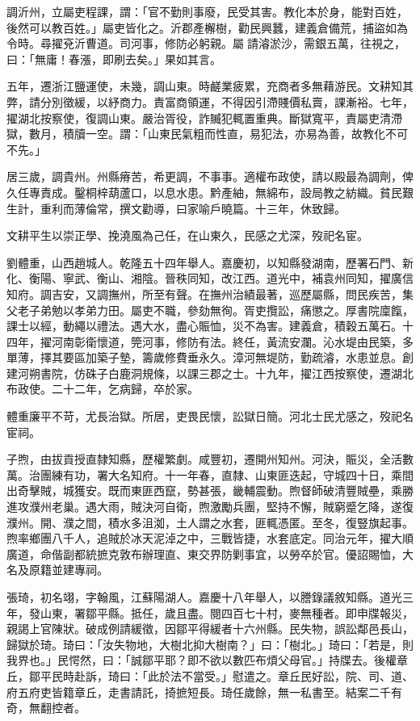 \begin{pinyinscope}
調沂州，立屬吏程課，謂：「官不勤則事廢，民受其害。教化本於身，能對百姓，後然可以教百姓。」屬吏皆化之。沂郡產檞樹，勸民興蠶，建義倉備荒，捕盜如為令時。尋擢兗沂曹道。司河事，修防必躬親。屬請濬淤沙，需銀五萬，往視之，曰：「無庸！春漲，即刷去矣。」果如其言。

五年，遷浙江鹽運使，未幾，調山東。時鹺業疲累，充商者多無藉游民。文耕知其弊，請分別徵緩，以紓商力。責富商領運，不得因引滯賤價私賣，課漸裕。七年，擢湖北按察使，復調山東。嚴治胥役，詐贓犯輒置重典。斷獄寬平，責屬吏清滯獄，數月，積牘一空。謂：「山東民氣粗而性直，易犯法，亦易為善，故教化不可不先。」

居三歲，調貴州。州縣瘠苦，希更調，不事事。適權布政使，請以殿最為調劑，俾久任專責成。鑿桐梓葫蘆口，以息水患。黔產紬，無綿布，設局教之紡織。貧民艱生計，重利而薄倫常，撰文勸導，曰家喻戶曉篇。十三年，休致歸。

文耕平生以崇正學、挽澆風為己任，在山東久，民感之尤深，歿祀名宦。

劉體重，山西趙城人。乾隆五十四年舉人。嘉慶初，以知縣發湖南，歷署石門、新化、衡陽、寧武、衡山、湘陰。晉秩同知，改江西。道光中，補袁州同知，擢廣信知府。調吉安，又調撫州，所至有聲。在撫州治績最著，巡歷屬縣，問民疾苦，集父老子弟勉以孝弟力田。屬吏不職，參劾無徇。胥吏攬訟，痛懲之。厚書院廩餼，課士以經，動繩以禮法。遇大水，盡心賑恤，災不為害。建義倉，積穀五萬石。十四年，擢河南彰衛懷道，筦河事，修防有法。終任，黃流安瀾。沁水堤由民築，多單薄，擇其要區加築子墊，籌歲修費垂永久。漳河無堤防，勤疏濬，水患並息。創建河朔書院，仿硃子白鹿洞規條，以課三郡之士。十九年，擢江西按察使，遷湖北布政使。二十二年，乞病歸，卒於家。

體重廉平不苛，尤長治獄。所居，吏畏民懷，訟獄日簡。河北士民尤感之，歿祀名宦祠。

子煦，由拔貢授直隸知縣，歷權繁劇。咸豐初，遷開州知州。河決，賑災，全活數萬。治團練有功，署大名知府。十一年春，直隸、山東匪迭起，守城四十日，乘間出奇擊賊，城獲安。既而東匪西竄，勢甚張，畿輔震動。煦督師破清豐賊壘，乘勝進攻濮州老巢。遇大雨，賊決河自衛，煦激勵兵團，堅持不懈，賊窮蹙乞降，遂復濮州。開、濮之間，積水多沮洳，土人謂之水套，匪輒憑匿。至冬，復豎旗起事。煦率鄉團八千人，追賊於冰天泥淖之中，三戰皆捷，水套底定。同治元年，擢大順廣道，命偕副都統摭克敦布辦理直、東交界防剿事宜，以勞卒於官。優詔賜恤，大名及原籍並建專祠。

張琦，初名翊，字翰風，江蘇陽湖人。嘉慶十八年舉人，以謄錄議敘知縣。道光三年，發山東，署鄒平縣。抵任，歲且盡。閱四百七十村，麥無種者。即申牒報災，親謁上官陳狀。破成例請緩徵，因鄒平得緩者十六州縣。民失物，誤訟鄰邑長山，歸獄於琦。琦曰：「汝失物地，大樹北抑大樹南？」曰：「樹北。」琦曰：「若是，則我界也。」民愕然，曰：「誠鄒平耶？即不欲以數匹布煩父母官。」持牒去。後權章丘，鄒平民時赴訴，琦曰：「此於法不當受。」慰遣之。章丘民好訟，院、司、道、府五府吏皆籍章丘，走書請託，掎摭短長。琦任歲餘，無一私書至。結案二千有奇，無翻控者。


\end{pinyinscope}
